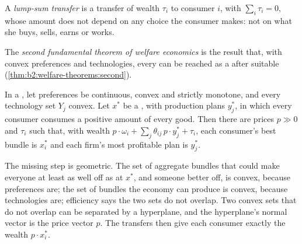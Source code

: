 \begin{definition}\label{def:b2:welfare-theorems:lump-sum}
A \emph{lump-sum transfer} is a transfer of wealth $\tau_i$ to consumer $i$,
with $\sum_i \tau_i = 0$, whose amount does not depend on any choice the consumer makes: not on what
she buys, sells, earns or works.
\end{definition}

\begin{definition}\label{def:b2:welfare-theorems:second-theorem}
The \emph{second fundamental theorem of welfare economics} is the result that, with convex preferences and technologies, every  can be reached as a  after suitable 
(\cref{thm:b2:welfare-theorems:second}).
\end{definition}

\begin{theorem}\label{thm:b2:welfare-theorems:second}
In a , let preferences be continuous, convex and strictly monotone, and every
technology set $Y_j$ convex. Let $x^*$ be a , with production plans $y^*_j$,
in which every consumer consumes a positive amount of every good. Then there are prices $p \gg 0$ and
 $\tau_i$ such that, with wealth $p \cdot \omega_i + \sum_j\theta_{ij}\,p \cdot y^*_j +
\tau_i$, each consumer's best bundle is $x^*_i$ and each firm's most profitable plan is $y^*_j$.
\end{theorem}

\admitted

The missing step is geometric. The set of aggregate bundles that could make everyone at least as well off
as at $x^*$, and someone better off, is convex, because preferences are; the set of bundles the economy
can produce is convex, because technologies are; efficiency says the two sets do not overlap. Two convex
sets that do not overlap can be separated by a hyperplane, and the hyperplane's normal vector is the
price vector $p$. The transfers then give each consumer exactly the wealth $p \cdot x^*_i$.

